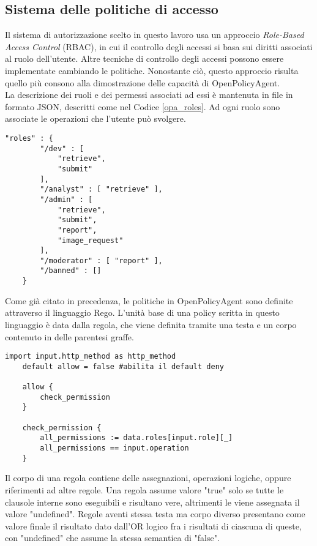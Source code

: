 \subsection{Sistema delle politiche di accesso}
Il sistema di autorizzazione scelto in questo lavoro usa un approccio \textit{Role-Based Access Control} (RBAC), in cui il 
controllo degli accessi si basa sui diritti associati al ruolo dell'utente. 
Altre tecniche di controllo degli accessi possono essere implementate cambiando le politiche. Nonostante ciò, 
questo approccio risulta quello più consono alla dimostrazione delle capacità di OpenPolicyAgent.
\\ La descrizione dei ruoli e dei permessi associati ad essi è mantenuta in file in formato JSON, descritti come nel Codice \ref*{opa_roles}.
Ad ogni ruolo sono associate le operazioni che l'utente può svolgere.
\lstset{language=nginx}
\begin{lstlisting}[caption={Descrizione dei ruoli},captionpos=b,label=opa_roles]
    "roles" : {
        "/dev" : [
            "retrieve", 
            "submit"
        ],
        "/analyst" : [ "retrieve" ],
        "/admin" : [ 
            "retrieve", 
            "submit",
            "report",
            "image_request"
        ],
        "/moderator" : [ "report" ], 
        "/banned" : []
    }
\end{lstlisting}
Come già citato in precedenza, le politiche in OpenPolicyAgent sono definite attraverso il linguaggio Rego. L'unità base di una policy scritta in questo linguaggio è data 
dalla regola, che viene definita tramite una testa e un corpo contenuto in delle parentesi graffe. 
\begin{lstlisting}[caption={Policy in linguaggio Rego},captionpos=b,label=opa_policy]
    import input.http_method as http_method   
    default allow = false #abilita il default deny

    allow {
        check_permission
    }

    check_permission {
        all_permissions := data.roles[input.role][_]
        all_permissions == input.operation
    }
\end{lstlisting}
Il corpo di una regola contiene delle assegnazioni, operazioni logiche, oppure riferimenti ad altre regole. Una regola assume valore "true" 
solo se tutte le clausole interne sono eseguibili e risultano vere, altrimenti le viene assegnata il valore "undefined". Regole aventi stessa testa ma corpo diverso presentano come valore finale 
il risultato dato dall'OR logico fra i risultati di ciascuna di queste, con "undefined" che assume la stessa semantica di "false". 
